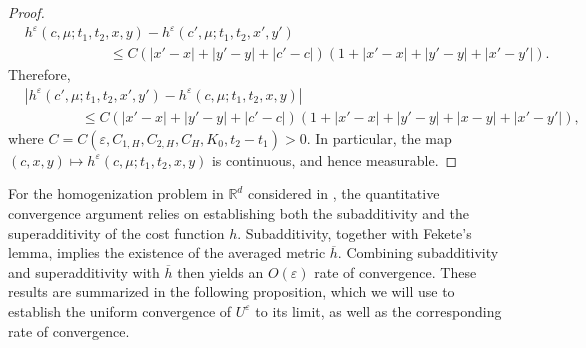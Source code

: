 \documentclass[reqno,11pt]{amsart}
\numberwithin{equation}{section}
\newcommand{\R}{\mathbb{R}} %
\newcommand{\e}{\varepsilon}
\newcommand{\ep}{\varepsilon}
\begin{document}
\begin{proof}
\[\begin{aligned}
&h^\e\left(c,\mu;t_1, t_2, x, y\right)-h^\e\left(c',\mu;t_1, t_2, x', y'\right)\\
&\qquad \qquad\qquad\leq C \left(\left|x'-x\right|+\left|y'-y\right|+|c'-c|\right)\left(1+\left|x'-x\right|+\left|y'-y\right|+|x'-y'|\right).
\end{aligned}
\]
Therefore,
\begin{equation}\label{eqn:mlip}
\begin{aligned}
&\left|h^\e(c',\mu;t_1,t_2, x',y')-h^\e(c,\mu;t_1,t_2, x,y)\right|\\
& \qquad \qquad\leq C \left(\left|x'-x\right|+\left|y'-y\right|+|c'-c|\right)\left(1+\left|x'-x\right|+\left|y'-y\right|+|x-y|+|x'-y'|\right),
\end{aligned}
\end{equation}
where $C=C(\ep,C_{1,H},C_{2,H}, C_H,K_0,t_2-t_1)>0$. In particular, the map $(c,x,y)\mapsto h^\e(c,\mu;t_1,t_2, x,y)$ is continuous, and hence measurable.
\end{proof}

For the homogenization problem in $\R^d$ considered in \cite{TranYu2021}, the quantitative convergence argument relies on establishing both the subadditivity and the superadditivity of the cost function $h$. Subadditivity, together with Fekete’s lemma, implies the existence of the averaged metric $\overline{h}$. Combining subadditivity and superadditivity with $\overline{h}$ then yields an $O(\ep)$ rate of convergence. These results are summarized in the following proposition, which we will use to establish the uniform convergence of $U^\ep$ to its limit, as well as the corresponding rate of convergence.
\end{document}
